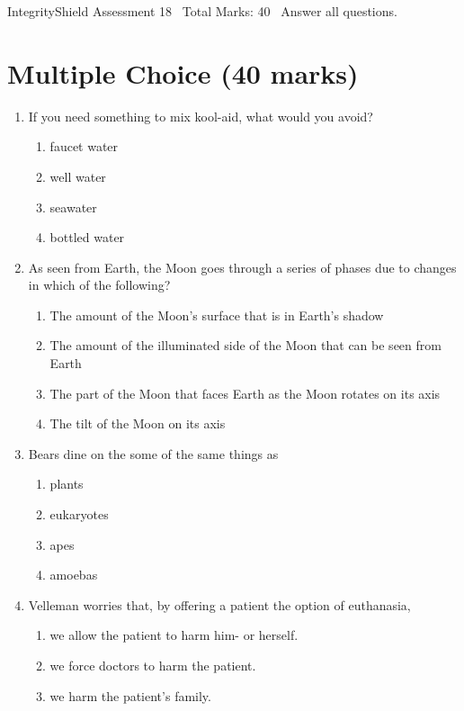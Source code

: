 \documentclass[12pt]{article}
\begin{document}
\begin{center}
IntegrityShield Assessment 18 \
Total Marks: 40 \
Answer all questions.
\end{center}

\section*{Multiple Choice (40 marks)}
\begin{enumerate}[label=\arabic*.]
\item If you need something to mix kool-aid, what would you avoid?
\begin{enumerate}[label=(\alph*)]
    \item faucet water
    \item well water
    \item seawater
    \item bottled water
\end{enumerate}
\item As seen from Earth, the Moon goes through a series of phases due to changes in which of the following?
\begin{enumerate}[label=(\alph*)]
    \item The amount of the Moon's surface that is in Earth's shadow
    \item The amount of the illuminated side of the Moon that can be seen from Earth
    \item The part of the Moon that faces Earth as the Moon rotates on its axis
    \item The tilt of the Moon on its axis
\end{enumerate}
\item Bears dine on the some of the same things as
\begin{enumerate}[label=(\alph*)]
    \item plants
    \item eukaryotes
    \item apes
    \item amoebas
\end{enumerate}
\item Velleman worries that, by offering a patient the option of euthanasia,
\begin{enumerate}[label=(\alph*)]
    \item we allow the patient to harm him- or herself.
    \item we force doctors to harm the patient.
    \item we harm the patient's family.

\end{enumerate}
\end{enumerate}
\end{document}
